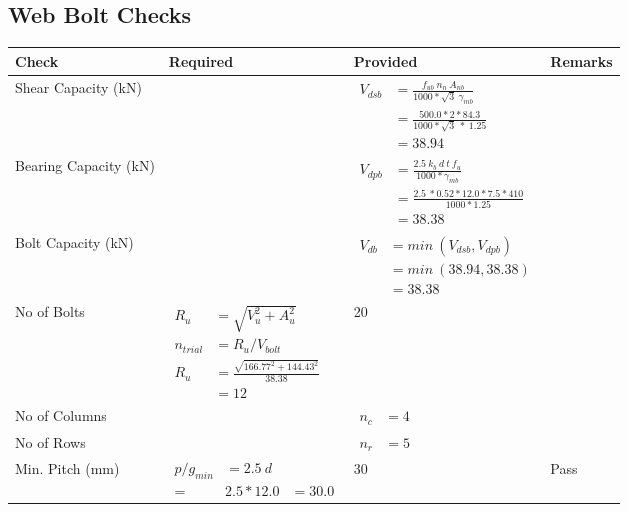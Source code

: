 \documentclass{article}%
\begin{document}
\subsection{Web Bolt Checks}%
\label{subsec:WebBoltChecks}%
\renewcommand{\arraystretch}{1.2}%
\begin{longtable}{|p{4cm}|p{5cm}|p{6.5cm}|p{1.5cm}|}%
\hline%
\rowcolor{OsdagGreen}%
Check&Required&Provided&Remarks\\%
\hline%
\endhead%
\hline%
Shear Capacity (kN)&&$\begin{aligned}V_{dsb} &= \frac{f_{ub} ~n_n~ A_{nb}}{1000*\sqrt{3} ~\gamma_{mb}}\\ &= \frac{500.0*2*84.3}{1000*\sqrt{3}~*~1.25}\\ &= 38.94\end{aligned}$&\\%
\hline%
Bearing Capacity (kN)&&$\begin{aligned}V_{dpb} &= \frac{2.5~ k_b~ d~ t~ f_u}{1000*\gamma_{mb}}\\ &= \frac{2.5~*0.52*12.0*7.5*410}{1000*1.25}\\ &=38.38\end{aligned}$&\\%
\hline%
Bolt Capacity (kN)&&$\begin{aligned}V_{db} &= min~ (V_{dsb}, V_{dpb})\\ &= min~ (38.94,38.38)\\ &=38.38\end{aligned}$&\\%
\hline%
No of Bolts&$\begin{aligned}R_{u} &= \sqrt{V_u^2+A_u^2}\\ n_{trial} &= R_u/ V_{bolt}\\ R_{u} &= \frac{\sqrt{166.77^2+144.43^2}}{38.38}\\ &=12\end{aligned}$&20&\\%
\hline%
No of Columns&&$\begin{aligned} n_c &=4 \end{aligned}$&\\%
\hline%
No of Rows&&$\begin{aligned} n_r &=5 \end{aligned}$&\\%
\hline%
Min. Pitch (mm)&$\begin{aligned}p/g_{min}&= 2.5 ~ d&\\ =&2.5*12.0&=30.0\end{aligned}$&30&Pass\\%

\end{longtable}
\end{document}
